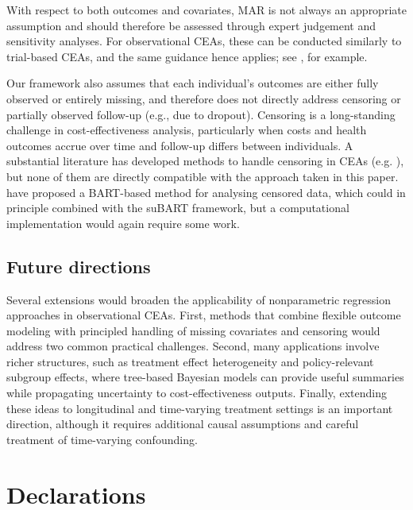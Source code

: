 \documentclass[aoas,preprint]{imsart}
\theoremstyle{plain}
\theoremstyle{definition}
\theoremstyle{remark}
\theoremstyle{remark}
\begin{document}
With respect to both outcomes and covariates, MAR is not always an appropriate assumption and should therefore be assessed through expert judgement and sensitivity analyses. For observational CEAs, these can be conducted similarly to trial-based CEAs, and the same guidance hence applies; see \citet{faria2014guide,mason2018bayesian}, for example.

Our framework also assumes that each individual's outcomes are either fully observed or entirely missing, and therefore does not directly address censoring or partially observed follow-up (e.g., due to dropout). Censoring is a long-standing challenge in cost-effectiveness analysis, particularly when costs and health outcomes accrue over time and follow-up differs between individuals. A substantial literature has developed methods to handle censoring in CEAs (e.g. \citet{lin1997estimating,bang2000estimating,willan2006statistical}), but none of them are directly compatible with the approach taken in this paper.  
\citet{sparapani2016nonparametric} have proposed a BART-based method for analysing censored data, which could in principle combined with the suBART framework, but a computational implementation would again require some work.

\subsection{Future directions}
Several extensions would broaden the applicability of nonparametric regression approaches in observational CEAs. First, methods that combine flexible outcome modeling with principled handling of missing covariates and censoring would address two common practical challenges. Second, many applications involve richer structures, such as treatment effect heterogeneity and policy-relevant subgroup effects, where tree-based Bayesian models can provide useful summaries while propagating uncertainty to cost-effectiveness outputs. Finally, extending these ideas to longitudinal and time-varying treatment settings is an important direction, although it requires additional causal assumptions and careful treatment of time-varying confounding.



\section{Declarations}
\end{document}

